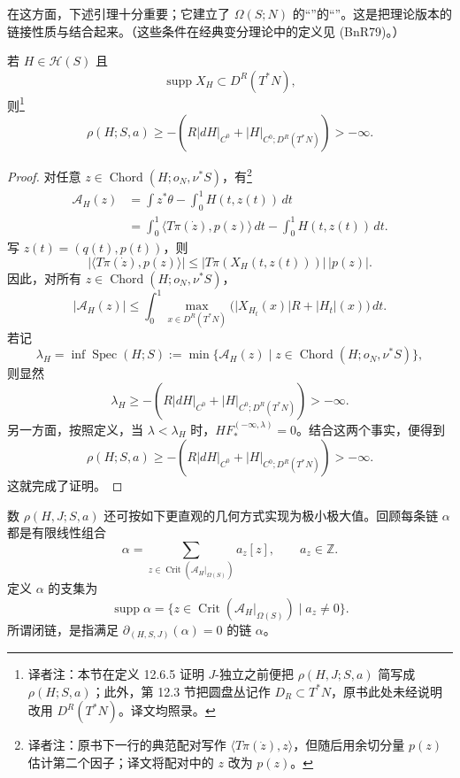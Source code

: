 在这方面，下述引理十分重要；它建立了 $\Omega(S;N)$ 的“\termFundamentalCycle{}”的“\termLinkingProperty{}”。这是把\personFloer{}理论版本的链接性质与\termPalaisSmaleCondition{}结合起来。（这些条件在经典变分理论中的定义见 (BnR79)。）

\begin{lemma}
\label{lem:spectral-number-lower-bound}
若 $H\in\mathcal H(S)$ 且
\[
  \operatorname{supp}X_H\subset D^R(T^*N),
\]
则\footnote{译者注：本节在定义 12.6.5 证明 $J$-独立之前便把 $\rho(H,J;S,a)$ 简写成 $\rho(H;S,a)$；此外，第 12.3 节把圆盘丛记作 $D_R\subset T^*N$，原书此处未经说明改用 $D^R(T^*N)$。译文均照录。}
\[
  \rho(H;S,a)
  \ge-\left(
    R\lvert dH\rvert_{C^0}
    +\lvert H\rvert_{C^0;D^R(T^*N)}
  \right)>-\infty.
\]
\end{lemma}

\begin{proof}
对任意 $z\in\operatorname{Chord}(H;o_N,\nu^*S)$，有\footnote{译者注：原书下一行的典范配对写作 $\langle T\pi(\dot z),z\rangle$，但随后用余切分量 $p(z)$ 估计第二个因子；译文将配对中的 $z$ 改为 $p(z)$。}
\[
\begin{split}
  \mathcal A_H(z)
  &=\int z^*\theta-\int_0^1H(t,z(t))\,dt\\
  &=\int_0^1\langle T\pi(\dot z),p(z)\rangle\,dt
    -\int_0^1H(t,z(t))\,dt.
\end{split}
\]
写 $z(t)=(q(t),p(t))$，则
\[
  \bigl\lvert\langle T\pi(\dot z),p(z)\rangle\bigr\rvert
  \le
  \lvert T\pi(X_H(t,z(t)))\rvert\,\lvert p(z)\rvert.
\]
因此，对所有 $z\in\operatorname{Chord}(H;o_N,\nu^*S)$，
\[
  \lvert\mathcal A_H(z)\rvert
  \le\int_0^1
  \max_{x\in D^R(T^*N)}
  \bigl(\lvert X_{H_t}(x)\rvert R+\lvert H_t\rvert(x)\bigr)\,dt.
\]
若记
\[
  \lambda_H
  =\inf\operatorname{Spec}(H;S)
  :=\min\{\mathcal A_H(z)\mid
    z\in\operatorname{Chord}(H;o_N,\nu^*S)\},
\]
则显然
\[
  \lambda_H
  \ge-\left(
    R\lvert dH\rvert_{C^0}
    +\lvert H\rvert_{C^0;D^R(T^*N)}
  \right)>-\infty.
\]
另一方面，按照定义，当 $\lambda<\lambda_H$ 时，$HF_*^{(-\infty,\lambda)}=0$。结合这两个事实，便得到
\[
  \rho(H;S,a)
  \ge-\left(
    R\lvert dH\rvert_{C^0}
    +\lvert H\rvert_{C^0;D^R(T^*N)}
  \right)>-\infty.
\]
这就完成了证明。
\end{proof}

数 $\rho(H,J;S,a)$ 还可按如下更直观的几何方式实现为极小极大值。回顾每条\personFloer{}链 $\alpha$ 都是有限线性组合
\[
  \alpha
  =\sum_{z\in\operatorname{Crit}(\mathcal A_H|_{\Omega(S)})}
  a_z[z],
  \qquad a_z\in\mathbb Z.
\]
定义 $\alpha$ 的支集为
\[
  \operatorname{supp}\alpha
  =\{z\in\operatorname{Crit}(\mathcal A_H|_{\Omega(S)})
    \mid a_z\ne0\}.
\]
所谓\personFloer{}闭链，是指满足 $\partial_{(H,S,J)}(\alpha)=0$ 的\personFloer{}链 $\alpha$。

